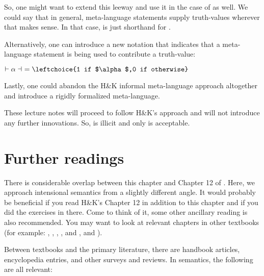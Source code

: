 %
So, one might want to extend this leeway and use it in the case of
 as well. We could say that in general, meta-language
statements supply truth-values wherever that makes sense. In that case,
 is just shorthand for .

\newcommand{\nupsis}[1]{\ensuremath{\vdash #1 \dashv}}

Alternatively, %
%
one can introduce a new notation that indicates that a meta-language statement
is being used to contribute a truth-value:

\ex $\nupsis{\alpha}\ = \leftchoice{1 if $\alpha$,0 if otherwise}$ \xe

Lastly, one could abandon the H\&K informal meta-language approach
altogether and introduce a rigidly formalized meta-language.

These lecture notes will proceed to follow H\&K's approach and will not
introduce any further innovations. So,  is illicit and only
 is acceptable.


\section{Further readings}

There is considerable overlap between this chapter and Chapter 12 of
\cite{heim-kratzer-1998-SemanticsGenerativeGrammar}. Here, we approach
intensional semantics from a slightly different angle. It would probably be
beneficial if you read H\&K's Chapter 12 in addition to this chapter and if you
did the exercises in there. Come to think of it, some other ancillary reading is
also recommended. You may want to look at relevant chapters in other textbooks
(for example: \cite[Chapters 5\&6]{dowty-wall-peters-1981-intro}, \cite[Volume
II: Intensional Logic and Logical Grammar]{gamut:91}, \cite[Chapter 5:
Intensionality]{chierchia-mcconnell-ginet-2000-meaning-grammar}, \cite[Chapters
7\&8: Propositions,
Intensions]{zimmermann-sternefeld-2013-IntroductionSemanticsEssentialGuide}, and
\cite[Chapter 6: Intensionality and Possible
Worlds]{winter-2016-ElementsFormalSemanticsIntroduction}, and \cite[Chapters
12\&13]{coppock-champollion-2022-InvitationFormalSemantics}).

Between textbooks and the primary literature, there are handbook articles,
encyclopedia entries, and other surveys and reviews. In semantics, the following
are all relevant:


